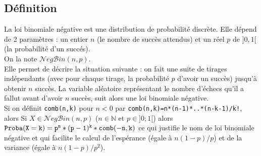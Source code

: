 \documentclass[a4paper,11pt]{book}
\newcommand{\N}{{\mathbb{N}}}
\begin{document}
\subsection{D\'efinition}
La loi binomiale n\'egative est une distribution de probabilit\'e 
discr\`ete. Elle d\'epend de 2 param\`etres : un entier $n$ (le nombre de 
succ\`es attendus) et un r\'eel $p$ de $]0,1[$ (la probabilit\'e d'un succ\'es).\\
On la note  $\mathcal{N}eg\mathcal{B}in(n,p)$.\\  
Elle permet de d\'ecrire la situation suivante : on fait une suite de tirages 
ind\'ependants (avec pour chaque tirage, la probabilit\'e $p$ d'avoir un 
succ\`es) jusqu'\`a obtenir $n$ succ\`es.
La variable al\'eatoire repr\'esentant le nombre d'\'echecs qu'il a fallut avant 
d'avoir $n$ succ\`es, suit alors une loi binomiale n\'egative. \\
Si on d\'efinit {\tt comb(n,k)} pour $n<0$ par {\tt comb(n,k)=n*(n-1)*..*(n-k-1)/k!}, alors
Si $X \in \mathcal{N}eg\mathcal{B}in(n,p)$ ($n \in \N$ et $p \in ]0;1[$) alors
${\tt Proba(X=k)=p^n*(p-1)^k*comb(-n,k)}$
ce qui justifie le nom de loi binomiale n\'egative et qui facilite le calcul de
l'esp\'erance (\'egale \`a $n(1-p)/p$) et de la variance (\'egale \`a 
$n(1-p)/p^2$).\\
\end{document}
